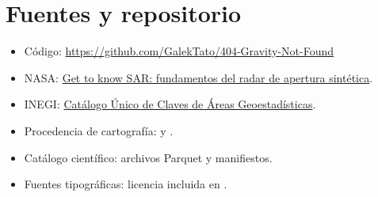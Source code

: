 \documentclass[11pt,a4paper]{article}
\begin{document}
\section{Fuentes y repositorio}
\begin{itemize}
\item Código: \url{https://github.com/GalekTato/404-Gravity-Not-Found}
\item NASA: \href{https://science.nasa.gov/mission/nisar/get-to-know-sar/}{Get to know SAR: fundamentos del radar de apertura sintética}.
\item INEGI: \href{https://www.inegi.org.mx/servicios/catalogounico/}{Catálogo Único de Claves de Áreas Geoestadísticas}.
\item Procedencia de cartografía:  y .
\item Catálogo científico: archivos Parquet y manifiestos.\\
\item Fuentes tipográficas: licencia incluida en .
\end{itemize}
\end{document}
